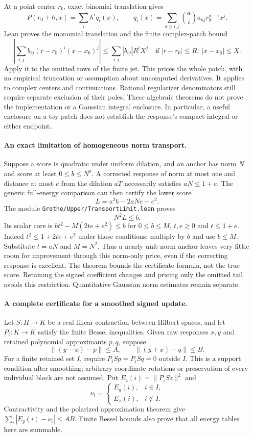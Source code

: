 At a point center $r_0$, exact binomial translation gives
\[
 P(r_0+h,x)=\sum_i h^i q_i(x),\qquad
 q_i(x)=\sum_{a\ge i,j}\binom ai a_{aj}r_0^{a-i}x^j.
\]
Lean proves the monomial translation and the finite complex-patch bound
\[
 \left|\sum_{i,j} b_{ij}(r-r_0)^i(x-x_0)^j\right|
 \le\sum_{i,j}|b_{ij}|R^i X^j
 \quad\text{if }|r-r_0|\le R,\ |x-x_0|\le X.
\]
Apply it to the omitted rows of the finite jet. This prices the whole
patch, with no empirical truncation or assumption about uncomputed
derivatives. It applies to complex centers and continuations. Rational
regularizer denominators still require separate exclusion of their poles.
These algebraic theorems do not prove the implementation or a Gaussian
integral enclosure. In particular, a useful enclosure on a toy patch does
not establish the response's compact integral or either endpoint.

\paragraph{An exact limitation of homogeneous norm transport.}
Suppose a score is quadratic under uniform dilation, and an anchor has
norm $N$ and score at least $0\le b\le N^2$. A corrected response of norm
at most one and distance at most $e$ from the dilation $aT$ necessarily
satisfies $aN\le1+e$. The generic full-energy comparison can then certify
the lower score
\[
 L=a^2b-2aNe-e^2.
\]
The module \texttt{Grothe/Upper/TransportLimit.lean} proves
\[
 N^2L\le b.
\]
Its scalar core is
$bt^2-M(2te+e^2)\le b$ for $0\le b\le M$, $t,e\ge0$ and $t\le1+e$.
Indeed $t^2\le1+2te+e^2$ under those conditions; multiply by $b$ and
use $b\le M$. Substitute $t=aN$ and $M=N^2$.
Thus a nearly unit-norm anchor leaves very little room for improvement
through this norm-only price, even if the correcting response is excellent.
The theorem bounds the certificate formula, not the true score. Retaining
the signed coefficient changes and pricing only the omitted tail avoids
this restriction. Quantitative Gaussian norm estimates remain separate.

\paragraph{A complete certificate for a smoothed signed update.}
Let $S:H\to K$ be a real linear contraction between Hilbert spaces, and
let $P_i:K\to K$ satisfy the finite Bessel inequalities. Given raw
responses $x,y$ and retained polynomial approximants $p,q$, suppose
\[
 \|(y-x)-p\|\le A,\qquad \|(y+x)-q\|\le B.
\]
For a finite retained set $I$, require $P_iSp=P_iSq=0$ outside $I$.
This is a support condition after smoothing; arbitrary coordinate
rotations or preservation of every individual block are not assumed.
Put $E_z(i)=\|P_iSz\|^2$ and
\[
 \nu_i=\begin{cases}E_y(i),&i\in I,\\ E_x(i),&i\notin I.\end{cases}
\]
Contractivity and the polarized approximation theorem give
$\sum_i|E_y(i)-\nu_i|\le AB$. Finite Bessel bounds also prove that all
energy tables here are summable.

